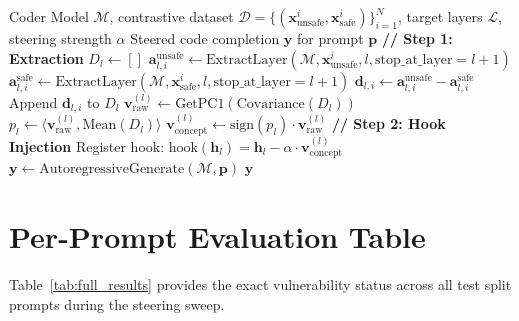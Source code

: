 \documentclass[journal, onecolumn]{IEEEtran}
\begin{document}
\begin{algorithm}[H]
\caption{PCA-based Representation Engineering for Code Security}
\label{alg:repe}
\begin{algorithmic}[1]
\REQUIRE Coder Model $\mathcal{M}$, contrastive dataset $\mathcal{D} = \{(\bm{x}^i_{\text{unsafe}}, \bm{x}^i_{\text{safe}})\}_{i=1}^N$, target layers $\mathcal{L}$, steering strength $\alpha$
\ENSURE Steered code completion $\bm{y}$ for prompt $\bm{p}$
\STATE \textbf{// Step 1: Extraction}
    \STATE $D_l \leftarrow []$
        \STATE $\bm{a}_{l, i}^{\text{unsafe}} \leftarrow \text{ExtractLayer}(\mathcal{M}, \bm{x}^i_{\text{unsafe}}, l, \text{stop\_at\_layer}=l+1)$
        \STATE $\bm{a}_{l, i}^{\text{safe}} \leftarrow \text{ExtractLayer}(\mathcal{M}, \bm{x}^i_{\text{safe}}, l, \text{stop\_at\_layer}=l+1)$
        \STATE $\bm{d}_{l, i} \leftarrow \bm{a}_{l, i}^{\text{unsafe}} - \bm{a}_{l, i}^{\text{safe}}$
        \STATE Append $\bm{d}_{l, i}$ to $D_l$
    \ENDFOR
    \STATE $\bm{v}_{\text{raw}}^{(l)} \leftarrow \text{GetPC1}(\text{Covariance}(D_l))$
    \STATE $p_l \leftarrow \langle \bm{v}_{\text{raw}}^{(l)}, \text{Mean}(D_l) \rangle$
    \STATE $\bm{v}_{\text{concept}}^{(l)} \leftarrow \text{sign}(p_l) \cdot \bm{v}_{\text{raw}}^{(l)}$
\ENDFOR
\STATE
\STATE \textbf{// Step 2: Hook Injection}
    \STATE Register hook: $\text{hook}(\bm{h}_l) = \bm{h}_l - \alpha \cdot \bm{v}_{\text{concept}}^{(l)}$
\ENDFOR
\STATE $\bm{y} \leftarrow \text{AutoregressiveGenerate}(\mathcal{M}, \bm{p})$
\RETURN $\bm{y}$
\end{algorithmic}
\end{algorithm}

\section{Per-Prompt Evaluation Table}
\label{app:full_results}
Table~\ref{tab:full_results} provides the exact vulnerability status across all test split prompts during the steering sweep.
\end{document}
